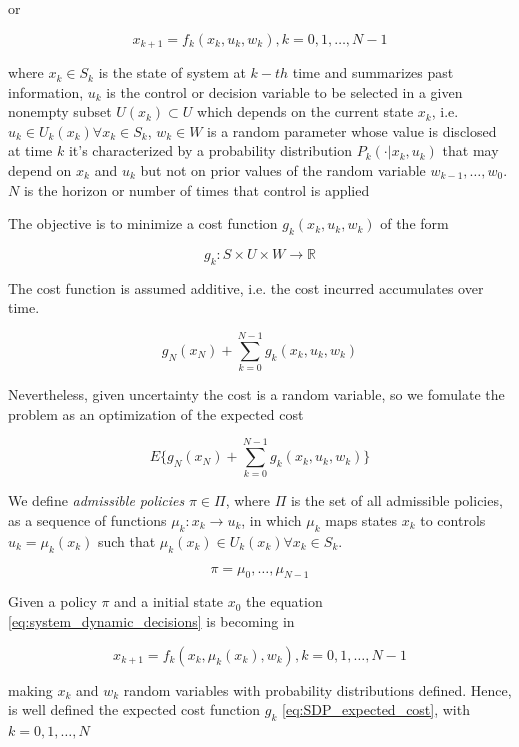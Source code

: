  or

\begin{equation}\label{eq:system_dynamic_decisions}
x_{k+1}=f_k(x_k,u_k,w_k), k=0,1,\ldots,N-1 
\end{equation}


where $x_k \in S_k$ is the state of system at $k-th$ time and summarizes past information, $u_k$ is the control or decision variable to be selected in a given nonempty subset $U(x_k) \subset U$ which depends on the current state $x_k$, i.e. $u_k \in U_k(x_k) \forall x_k \in S_k$, $w_k \in W$ is a random parameter whose value is disclosed at time $k$ it's characterized by a probability distribution $P_k(\cdot|x_k,u_k)$ that may depend on $x_k$ and $u_k$ but not on prior values of the random variable $w_{k-1},\ldots,w_0$. $N$ is the horizon or number of times that control is applied

The objective is to minimize a cost function $g_k(x_k,u_k,w_k)$ of the form

\[g_k:S\times U \times W \rightarrow \mathbb{R}\]

The cost function is assumed additive, i.e. the cost incurred accumulates over time.

\[g_N(x_N)+\sum_{k=0}^{N-1}g_k(x_k,u_k,w_k)\]

Nevertheless, given uncertainty the cost is a random variable, so we fomulate the problem as an optimization of the expected cost 

\begin{equation}\label{eq:SDP_expected_cost}
 E\biggr\{g_N(x_N)+\sum_{k=0}^{N-1}g_k(x_k,u_k,w_k)\biggr\}
\end{equation}

We define \textit{admissible policies} $\pi \in \Pi$, where $\Pi$ is the set of all admissible policies, as a sequence of functions $\mu_k:x_k\rightarrow u_k$, in which $\mu_k$ maps states $x_k$ to controls $u_k=\mu_k(x_k)$ such that $\mu_k(x_k) \in U_k(x_k) \forall x_k \in S_k$.

\[\pi={\mu_0,\ldots,\mu_{N-1}}\]

Given a policy $\pi$ and a initial state $x_0$ the equation \ref{eq:system_dynamic_decisions} is becoming in 

\begin{equation}\label{eq:system_dynamic_policy}
x_{k+1}=f_k(x_k,\mu_k(x_k),w_k), k=0,1,\ldots,N-1 
\end{equation}

making $x_k$ and $w_k$ random variables with probability distributions defined. Hence, is well defined the expected cost function $g_k$ \ref{eq:SDP_expected_cost}, with $k=0,1,\ldots,N$

